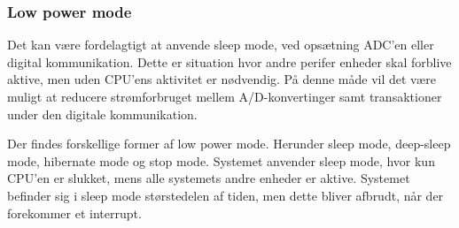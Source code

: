 \subsubsection{Low power mode}
Det kan være fordelagtigt at anvende sleep mode, ved opsætning ADC'en eller digital kommunikation. Dette er situation hvor andre perifer enheder skal forblive aktive, men uden CPU'ens aktivitet er nødvendig. På denne måde vil det være muligt at reducere strømforbruget mellem A/D-konvertinger samt transaktioner under den digitale kommunikation.

Der findes forskellige former af low power mode. Herunder sleep mode, deep-sleep mode, hibernate mode og stop mode. Systemet anvender sleep mode, hvor kun CPU'en er slukket, mens alle systemets andre enheder er aktive. Systemet befinder sig i sleep mode størstedelen af tiden, men dette bliver afbrudt, når der forekommer et interrupt.  \citep{cypresspsoc420152}
